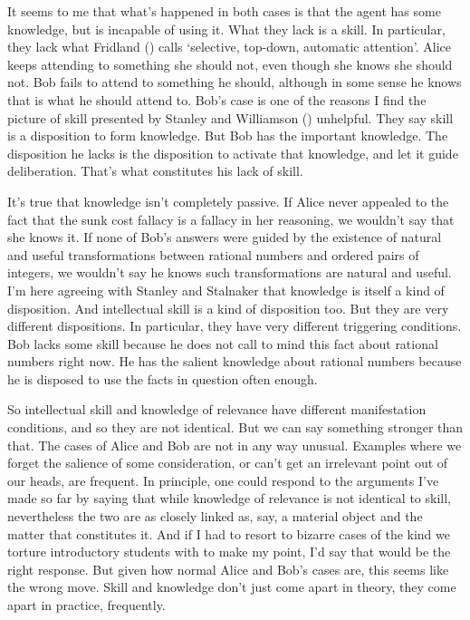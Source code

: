 \documentclass[
  11pt,
  letterpaper,
  DIV=11,
  numbers=noendperiod,
  oneside]{scrartcl}
\begin{document}
It seems to me that what's happened in both cases is that the agent has
some knowledge, but is incapable of using it. What they lack is a skill.
In particular, they lack what Fridland
() calls `selective, top-down,
automatic attention'. Alice keeps attending to something she should not,
even though she knows she should not. Bob fails to attend to something
he should, although in some sense he knows that is what he should attend
to. Bob's case is one of the reasons I find the picture of skill
presented by Stanley and Williamson
() unhelpful. They say skill
is a disposition to form knowledge. But Bob has the important knowledge.
The disposition he lacks is the disposition to activate that knowledge,
and let it guide deliberation. That's what constitutes his lack of
skill.

It's true that knowledge isn't completely passive. If Alice never
appealed to the fact that the sunk cost fallacy is a fallacy in her
reasoning, we wouldn't say that she knows it. If none of Bob's answers
were guided by the existence of natural and useful transformations
between rational numbers and ordered pairs of integers, we wouldn't say
he knows such transformations are natural and useful. I'm here agreeing
with Stanley and Stalnaker that knowledge is itself a kind of
disposition. And intellectual skill is a kind of disposition too. But
they are very different dispositions. In particular, they have very
different triggering conditions. Bob lacks some skill because he does
not call to mind this fact about rational numbers right now. He has the
salient knowledge about rational numbers because he is disposed to use
the facts in question often enough.

So intellectual skill and knowledge of relevance have different
manifestation conditions, and so they are not identical. But we can say
something stronger than that. The cases of Alice and Bob are not in any
way unusual. Examples where we forget the salience of some
consideration, or can't get an irrelevant point out of our heads, are
frequent. In principle, one could respond to the arguments I've made so
far by saying that while knowledge of relevance is not identical to
skill, nevertheless the two are as closely linked as, say, a material
object and the matter that constitutes it. And if I had to resort to
bizarre cases of the kind we torture introductory students with to make
my point, I'd say that would be the right response. But given how normal
Alice and Bob's cases are, this seems like the wrong move. Skill and
knowledge don't just come apart in theory, they come apart in practice,
frequently.
\end{document}
